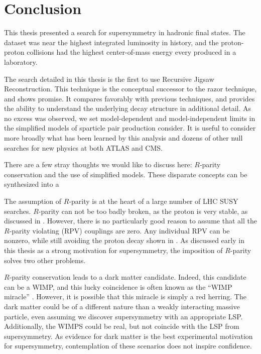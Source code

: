 
\chapter[Conclusion][Conclusion]{Conclusion} %

This thesis presented a search for supersymmetry in hadronic final states.
The dataset was near the highest integrated luminosity in history, and the proton-proton collisions had the highest center-of-mass energy every produced in a laboratory.

The search detailed in this thesis is the first to use Recursive Jigsaw Reconstruction.
This technique is the conceptual successor to the razor technique, and shows promise.
It compares favorably with previous techniques, and provides the ability to understand the underlying decay structure in additional detail.
As no excess was observed, we set model-dependent and model-independent limits in the simplified models of sparticle pair production consider.
It is useful to consider more broadly what has been learned by this analysis and dozens of other null searches for new physics at both ATLAS and CMS.

There are a few stray thoughts we would like to discuss here: $R$-parity conservation and the use of simplified models.
These disparate concepts can be synthesized into a

The assumption of $R$-parity is at the heart of a large number of LHC SUSY searches.
$R$-parity can not be too badly broken, as the proton is very stable, as discussed in .
However, there is no particularly good reason to assume that all the $R$-parity violating (RPV) couplings are zero.
Any individual RPV can be nonzero, while still avoiding the proton decay shown in .
As discussed early in this thesis as a strong motivation for supersymmetry, the imposition of $R$-parity solves two other problems.

$R$-parity conservation leads to a dark matter candidate.
Indeed, this candidate can be a WIMP, and this lucky coincidence is often known as the ``WIMP miracle'' \cite{darkMatterPrimer}.
However, it is possible that this miracle is simply a red herring.
The dark matter could be of a different nature than a weakly interacting massive particle, even assuming we discover supersymmetry with an appropriate LSP.
Additionally, the WIMPS could be real, but not coincide with the LSP from supersymmetry.
As evidence for dark matter is the best experimental motivation for supersymmetry, contemplation of these scenarios does not inspire confidence.

